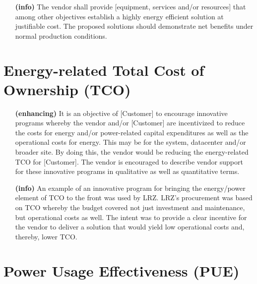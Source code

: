 \begin{itemize}

\item[\textbf{(info)}]
The vendor shall provide [equipment, services and/or resources] that \textemdash among 
other objectives \textemdash establish a highly energy efficient solution at 
justifiable cost.  The proposed solutions should demonstrate net benefits under 
normal production conditions.  
\end{itemize}

\section{Energy-related Total Cost of Ownership (TCO)}

\begin{itemize}

\item[\textbf{(enhancing)}]
It is an objective of [Customer] to encourage innovative programs whereby the 
vendor and/or [Customer] are incentivized to reduce the costs for energy and/or 
power-related capital expenditures as well as the operational costs for energy.  
This may be for the system, datacenter and/or broader site.  By doing this, the 
vendor would be reducing the energy-related TCO for [Customer].  The vendor is 
encouraged to describe vendor support for these innovative programs in qualitative 
as well as quantitative terms.

\item[\textbf{(info)}]
An example of an innovative program for bringing the energy/power element of 
TCO to the front was used by LRZ.  LRZ's  procurement was based on TCO whereby the 
budget covered not just investment and maintenance, but operational costs as well. 
The intent was to provide a clear incentive for the vendor to deliver a solution that 
would yield low operational costs and, thereby, lower TCO.

\end{itemize}

\section{Power Usage Effectiveness (PUE)}


